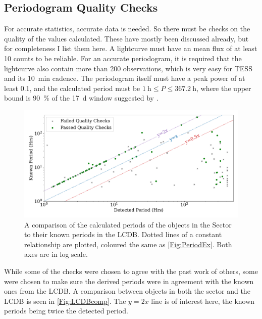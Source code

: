 \documentclass{UCreport}
\begin{document}

\subsection{Periodogram Quality Checks}\label{SubSec:QualCheck}



For accurate statistics, accurate data is needed.
So there must be checks on the quality of the values calculated.
These have mostly been discussed already, but for completeness I list them here.
A lightcurve must have an mean flux of at least 10 counts to be reliable.
For an accurate periodogram, it is required that the lightcurve also contain more than 200 observations, which is very easy for TESS and its \qty{10}{\minute} cadence.
The periodogram itself must have a peak power of at least 0.1, and the calculated period must be $\qty{1}{\hour}\leq P \leq \qty{367.2}{\hour}$, where the upper bound is \qty{90}{\percent} of the \qty{17}{\day} window suggested by \cite{McNeill2023}.
\begin{figure}[t]
  \centering
  \includegraphics[width=\textwidth]{../OzData/LCBDcompLogScaleLineText1.pdf}
  \caption[Known against calculated period]{A comparison of the calculated periods of the objects in the Sector to their known periods in the LCDB.
    Dotted lines of a constant relationship are plotted, coloured the same as \autoref{Fig:PeriodEx}.
    Both axes are in log scale.
  }

  \label{Fig:LCDBcomp}
\end{figure}
While some of the checks were chosen to agree with the past work of others, some were chosen to make sure the derived periods were in agreement with the known ones from the LCDB.
A comparison between objects in both the sector and the LCDB is seen in \autoref{Fig:LCDBcomp}.
The $y=2x$ line is of interest here, the known periods being twice the detected period.
\end{document}
